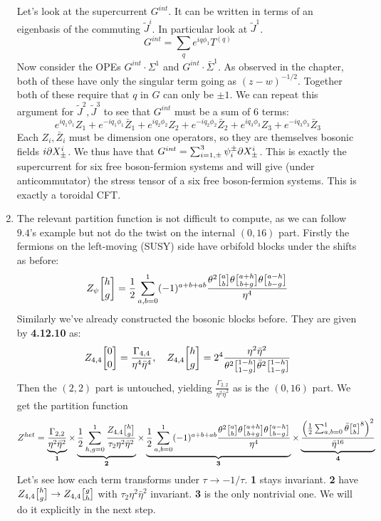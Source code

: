 \documentclass[11pt, class=article, crop=false]{standalone}
\begin{document}
\begin{enumerate}
	Let's look at the supercurrent $G^{int}$. It can be written in terms of an eigenbasis of the commuting $\tilde J^i$. In particular look at $\tilde J^1$. 
	\[
		G^{int} = \sum_q e^{i q \phi_1} T^{(q)} 
	\]
	 Now consider the OPEs $G^{int} \cdot \Sigma^1$ and $G^{int} \cdot \bar \Sigma^1$. As observed in the chapter, both of these have only the singular term going as $(z-w)^{-1/2}$. Together both of these require that $q$ in $G$ can only be $\pm 1$. We can repeat this argument for $\tilde J^2, \tilde J^3$ to see that $G^{int}$ must be a sum of $6$ terms:
	 \[
	 	 e^{i q_1 \phi_1} Z_1 + e^{-i q_1 \phi_1} \bar Z_1 + e^{i q_2 \phi_2} Z_2 + e^{-i q_2 \phi_2} \bar Z_2 + e^{i q_3 \phi_3} Z_3 + e^{-i q_3 \phi_3} \bar Z_3
	 \]
	 Each $Z_i, \bar Z_i$ must be dimension one operators, so they are themselves bosonic fields $i \partial X^i_\pm$. We thus have that $G^{int} = \sum_{i=1, \pm}^3 \psi_i^\pm \partial X^i_{\pm}$. This is exactly the supercurrent for six free boson-fermion systems and will give (under anticommutator) the stress tensor of a six free boson-fermion systems. This is exactly a toroidal CFT.
	\item The relevant partition function is not difficult to compute, as we can follow $9.4$'s example but not do the twist on the internal $(0,16)$ part. Firstly the fermions on the left-moving (SUSY) side have orbifold blocks under the shifts as before:
	\[
		Z_{\psi}\twist{h}{g} = \frac12 \sum_{a,b=0}^1 (-1)^{a+b+ab} \frac{\theta^2 \twist{a}{b} \theta \twist{a+h}{b+g} \theta \twist{a-h}{b-g}}{\eta^4}
	\]
	Similarly we've already constructed the bosonic blocks before. They are given by \textbf{4.12.10} as:
	\[
		Z_{4,4}\twist00 = \frac{\Gamma_{4,4}}{\eta^4 \bar \eta^4}, \quad Z_{4,4} \twist{h}{g} = 2^4 \frac{\eta^2 \bar \eta^2}{\theta^2 \twist{1-h}{1-g} \bar \theta^2 \twist{1-h}{1-g}}
	\]
	Then the $(2,2)$ part is untouched, yielding $\frac{\Gamma_{2,2}}{\eta^2 \bar \eta^2}$ as is the $(0,16)$ part. We get the partition function
	\[
		Z^{het} = \underbrace{\frac{\Gamma_{2,2}}{\eta^2 \bar \eta^2}}_{\mathbf{1}}
		 \times \underbrace{\frac12 \sum_{h,g=0}^1 \frac{Z_{4,4} \twist{h}{g}}{\tau_2 \eta^2 \bar \eta^2}}_{\mathbf{2}} 
		\times \underbrace{\frac12 \sum_{a,b=0}^1 (-1)^{a+b+ab} \frac{\theta^2 \twist{a}{b} \theta \twist{a+h}{b+g} \theta \twist{a-h}{b-g}}{\eta^4}}_{\mathbf{3}} 
		\times \underbrace{\frac{\left(\frac12 \sum_{a,b=0}^1 \bar \theta \twist ab^8 \right)^2}{\bar \eta^{16}}}_{\mathbf{4}}
	\]
	Let's see how each term transforms under $\tau \to -1/\tau$. \textbf{1} stays invariant. \textbf{2} have $Z_{4,4} \twist{h}{g} \to Z_{4,4} \twist{g}{h}$ with  $\tau_2 \eta^2 \bar \eta^2$ invariant. \textbf{3} is the only nontrivial one. We will do it explicitly in the next step. %

\end{enumerate}
\end{document}
